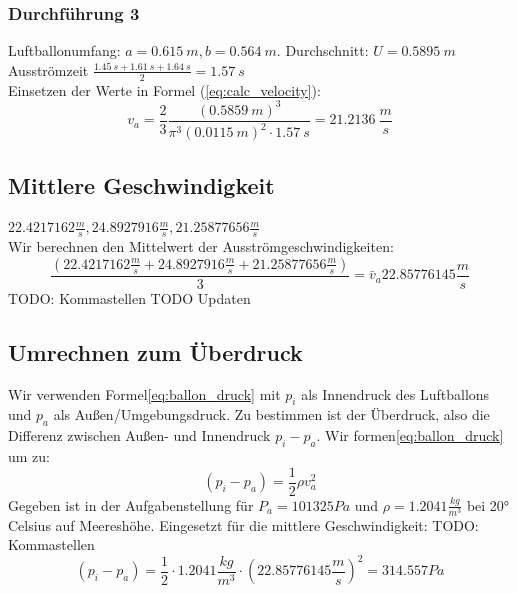 \documentclass{article}
\begin{document}
    \subsubsection{Durchführung 3}
        Luftballonumfang: \(a = \SI{0.615}{m}, b = \SI{0.564}{m} \). Durchschnitt: \(U = \SI{0.5895}{m} \) \\
        Ausströmzeit \( \frac{\SI{1.45}{s} + \SI{1.61}{s} + \SI{1.64}{s} }{2} = \SI{1.57}{s} \) \\
        Einsetzen der Werte in Formel (\ref{eq:calc_velocity}):
        \[ v_a = \frac{2}{3} \frac{{( \SI{0.5859}{m} )}^3}{\pi^3 {( \SI{0.0115}{m} )}^2 \cdot \SI{1.57}{s} } = \SI{21.2136}{\frac{m}{s}} \]

    \subsection{Mittlere Geschwindigkeit}
    \( 22.4217162 \frac{m}{s}, 24.8927916 \frac{m}{s}, 21.25877656 \frac{m}{s} \) \\
    Wir berechnen den Mittelwert der Ausströmgeschwindigkeiten:
    \begin{equation} \label{val:mittlere_geschw}
        \frac{ (22.4217162 \frac{m}{s} + 24.8927916 \frac{m}{s} + 21.25877656 \frac{m}{s}) }{3} = \bar{v}_a 22.85776145 \frac{m}{s}
    \end{equation}
    TODO: Kommastellen TODO Updaten

    \subsection{Umrechnen zum Überdruck}
    Wir verwenden Formel\ref{eq:ballon_druck} mit \(p_i\) als Innendruck des Luftballons und \(p_a\) als Außen/Umgebungsdruck.
    Zu bestimmen ist der Überdruck, also die Differenz zwischen Außen- und Innendruck \(p_i - p_a\).
    Wir formen\ref{eq:ballon_druck} um zu:
    \begin{equation} \label{eq:ballon_uberdruck}
        (p_i - p_a) = \frac{1}{2} \rho v_a^2
    \end{equation}
    Gegeben ist in der Aufgabenstellung\cite{Aufgabenstellung} für \( P_a = 101 325 Pa\) und \(\rho = 1.2041 \frac{kg}{m^3} \) bei 20° Celsius auf Meereshöhe. 
    Eingesetzt für die mittlere Geschwindigkeit: TODO: Kommastellen
    \begin{equation}
        (p_i - p_a) = \frac{1}{2} \cdot 1.2041 \frac{kg}{m^3} \cdot {(22.85776145 \frac{m}{s})}^2 = 314.557 Pa
    \end{equation}
\end{document}
